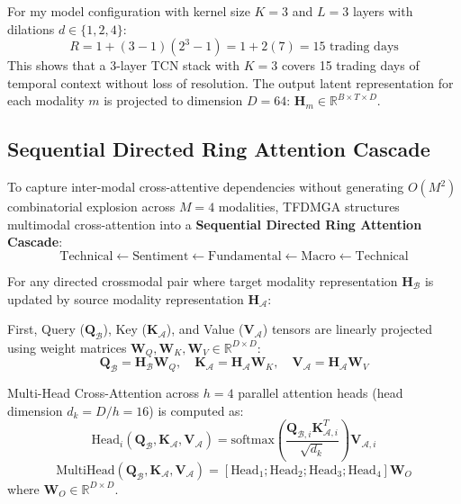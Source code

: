 For my model configuration with kernel size $K = 3$ and $L = 3$ layers with dilations $d \in \{1, 2, 4\}$:
\begin{equation}
R = 1 + (3 - 1)(2^3 - 1) = 1 + 2(7) = 15 \text{ trading days}
\end{equation}
This shows that a 3-layer TCN stack with $K=3$ covers 15 trading days of temporal context without loss of resolution. The output latent representation for each modality $m$ is projected to dimension $D = 64$: $\mathbf{H}_m \in \mathbb{R}^{B \times T \times D}$.

\subsection{Sequential Directed Ring Attention Cascade}
\label{subsec:ch3_ring_attention}

To capture inter-modal cross-attentive dependencies without generating $O(M^2)$ combinatorial explosion across $M=4$ modalities, TFDMGA structures multimodal cross-attention into a \textbf{Sequential Directed Ring Attention Cascade}:
\begin{equation}
\text{Technical} \leftarrow \text{Sentiment} \leftarrow \text{Fundamental} \leftarrow \text{Macro} \leftarrow \text{Technical}
\end{equation}

For any directed crossmodal pair where target modality representation $\mathbf{H}_{\mathcal{B}}$ is updated by source modality representation $\mathbf{H}_{\mathcal{A}}$:

First, Query ($\mathbf{Q}_{\mathcal{B}}$), Key ($\mathbf{K}_{\mathcal{A}}$), and Value ($\mathbf{V}_{\mathcal{A}}$) tensors are linearly projected using weight matrices $\mathbf{W}_Q, \mathbf{W}_K, \mathbf{W}_V \in \mathbb{R}^{D \times D}$:
\begin{equation}
\mathbf{Q}_{\mathcal{B}} = \mathbf{H}_{\mathcal{B}} \mathbf{W}_Q, \quad \mathbf{K}_{\mathcal{A}} = \mathbf{H}_{\mathcal{A}} \mathbf{W}_K, \quad \mathbf{V}_{\mathcal{A}} = \mathbf{H}_{\mathcal{A}} \mathbf{W}_V
\end{equation}

Multi-Head Cross-Attention across $h=4$ parallel attention heads (head dimension $d_k = D/h = 16$) is computed as:
\begin{equation}
\text{Head}_i(\mathbf{Q}_{\mathcal{B}}, \mathbf{K}_{\mathcal{A}}, \mathbf{V}_{\mathcal{A}}) = \text{softmax}\left( \frac{\mathbf{Q}_{\mathcal{B},i} \mathbf{K}_{\mathcal{A},i}^T}{\sqrt{d_k}} \right) \mathbf{V}_{\mathcal{A},i}
\label{eq:ch3_cross_attention_head}
\end{equation}
\begin{equation}
\text{MultiHead}(\mathbf{Q}_{\mathcal{B}}, \mathbf{K}_{\mathcal{A}}, \mathbf{V}_{\mathcal{A}}) = \left[ \text{Head}_1 ; \text{Head}_2 ; \text{Head}_3 ; \text{Head}_4 \right] \mathbf{W}_O
\end{equation}
where $\mathbf{W}_O \in \mathbb{R}^{D \times D}$.

